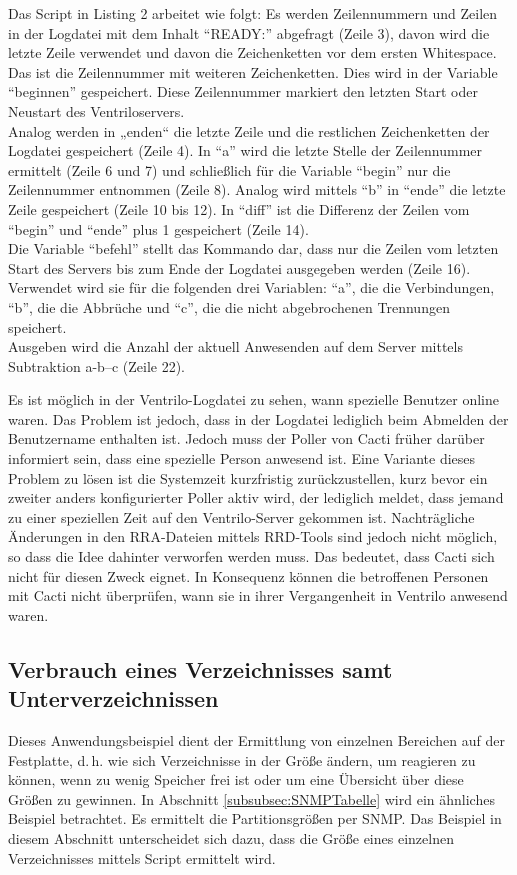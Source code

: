 \documentclass[12pt,ngerman,toc=listofnumbered,toc=bibliographynumbered,toc=index,headsepline=true]{scrbook}
\begin{document}
Das Script in Listing 2 arbeitet wie folgt: Es werden
Zeilennummern und Zeilen in der Logdatei mit dem Inhalt \enquote{READY:}
abgefragt (Zeile 3), davon wird die letzte Zeile verwendet und davon die
Zeichenketten vor dem ersten Whitespace. Das ist die Zeilennummer mit weiteren
Zeichenketten. Dies wird in der Variable \enquote{beginnen} gespeichert. Diese
Zeilennummer markiert den letzten Start oder Neustart des Ventriloservers.\\
Analog werden in „enden“ die letzte Zeile und die restlichen Zeichenketten der
Logdatei gespeichert (Zeile 4). In \enquote{a} wird die letzte Stelle der
Zeilennummer ermittelt (Zeile 6 und 7) und schließlich für die Variable
\enquote{begin} nur die Zeilennummer entnommen (Zeile 8). Analog wird mittels
\enquote{b} in \enquote{ende} die letzte Zeile gespeichert (Zeile 10 bis 12). In
\enquote{diff} ist die Differenz der Zeilen vom \enquote{begin} und
\enquote{ende} plus 1 gespeichert (Zeile 14).\\
Die Variable \enquote{befehl} stellt das Kommando dar, dass nur die Zeilen vom
letzten Start des Servers bis zum Ende der Logdatei ausgegeben werden (Zeile
16). Verwendet wird sie für die folgenden drei Variablen: \enquote{a}, die die
Verbindungen, \enquote{b}, die die Abbrüche und \enquote{c}, die die nicht
abgebrochenen Trennungen speichert.\\
Ausgeben wird die Anzahl der aktuell Anwesenden auf dem Server mittels
Subtraktion a-b–c (Zeile 22).

Es ist möglich in der Ventrilo-Logdatei zu sehen, wann spezielle Benutzer online
waren. Das Problem ist jedoch, dass in der Logdatei
lediglich beim Abmelden der Benutzername enthalten ist. Jedoch muss der Poller
von Cacti früher darüber informiert sein, dass eine spezielle Person anwesend
ist. Eine Variante dieses Problem zu lösen ist die Systemzeit kurzfristig
zurückzustellen, kurz bevor ein zweiter anders konfigurierter Poller aktiv wird,
der lediglich meldet, dass jemand zu einer speziellen Zeit auf den
Ventrilo-Server gekommen ist. Nachträgliche Änderungen in den RRA-Dateien
mittels RRD-Tools sind jedoch nicht möglich, so dass die Idee dahinter verworfen
werden muss. Das bedeutet, dass Cacti sich nicht für diesen Zweck eignet. In
Konsequenz können die betroffenen Personen mit Cacti nicht überprüfen, wann sie
in ihrer Vergangenheit in Ventrilo anwesend waren.

\subsection{Verbrauch eines Verzeichnisses samt Unterverzeichnissen}
Dieses Anwendungsbeispiel dient der Ermittlung von einzelnen Bereichen auf der
Festplatte, d.\,h. wie sich Verzeichnisse in der Größe ändern, um reagieren zu
können, wenn zu wenig Speicher frei ist oder um eine Übersicht über
diese Größen zu gewinnen. In Abschnitt \ref{subsubsec:SNMPTabelle} wird ein
ähnliches Beispiel betrachtet. Es ermittelt die Partitionsgrößen per SNMP. Das
Beispiel in diesem Abschnitt unterscheidet sich dazu, dass die Größe eines
einzelnen Verzeichnisses mittels Script ermittelt wird.
\end{document}
